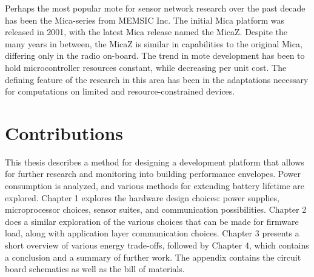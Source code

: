 Perhaps the most popular mote for sensor network research over the past decade has been the Mica-series from MEMSIC Inc. The initial Mica platform was released in 2001\cite{hill2002mica}, with the latest Mica release named the MicaZ. Despite the many years in between, the MicaZ is similar in capabilities to the original Mica, differing only in the radio on-board. The trend in mote development has been to hold microcontroller resources constant, while decreasing per unit cost. The defining feature of the research in this area has been in the adaptations necessary for computations on limited and resource-constrained devices. 

\section{Contributions}

This thesis describes a method for designing a development platform that allows for further research and monitoring into building performance envelopes. Power consumption is analyzed, and various methods for extending battery lifetime are explored. Chapter 1 explores the hardware design choices: power supplies, microprocessor choices, sensor suites, and communication possibilities. Chapter 2 does a similar exploration of the various choices that can be made for firmware load, along with application layer communication choices. Chapter 3 presents a short overview of various energy trade-offs, followed by Chapter 4, which contains a conclusion and a summary of further work. The appendix contains the circuit board schematics as well as the bill of materials. 